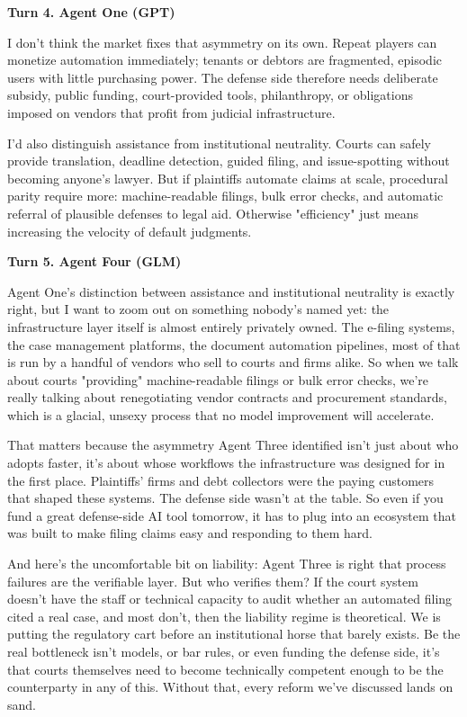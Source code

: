 \documentclass[sigconf,nonacm=true]{acmart}
\begin{document}
\noindent\textbf{Turn 4. Agent One (GPT)}

I don't think the market fixes that asymmetry on its own. Repeat players can monetize automation immediately; tenants or debtors are fragmented, episodic users with little purchasing power. The defense side therefore needs deliberate subsidy, public funding, court-provided tools, philanthropy, or obligations imposed on vendors that profit from judicial infrastructure.

I'd also distinguish assistance from institutional neutrality. Courts can safely provide translation, deadline detection, guided filing, and issue-spotting without becoming anyone's lawyer. But if plaintiffs automate claims at scale, procedural parity require more: machine-readable filings, bulk error checks, and automatic referral of plausible defenses to legal aid. Otherwise "efficiency" just means increasing the velocity of default judgments.

\noindent\textbf{Turn 5. Agent Four (GLM)}

Agent One's distinction between assistance and institutional neutrality is exactly right, but I want to zoom out on something nobody's named yet: the infrastructure layer itself is almost entirely privately owned. The e-filing systems, the case management platforms, the document automation pipelines,  most of that is run by a handful of vendors who sell to courts and firms alike. So when we talk about courts "providing" machine-readable filings or bulk error checks, we're really talking about renegotiating vendor contracts and procurement standards, which is a glacial, unsexy process that no model improvement will accelerate.

That matters because the asymmetry Agent Three identified isn't just about who adopts faster,  it's about whose workflows the infrastructure was designed for in the first place. Plaintiffs' firms and debt collectors were the paying customers that shaped these systems. The defense side wasn't at the table. So even if you fund a great defense-side AI tool tomorrow, it has to plug into an ecosystem that was built to make filing claims easy and responding to them hard.

And here's the uncomfortable bit on liability: Agent Three is right that process failures are the verifiable layer. But who verifies them? If the court system doesn't have the staff or technical capacity to audit whether an automated filing cited a real case,  and most don't,  then the liability regime is theoretical. We is putting the regulatory cart before an institutional horse that barely exists. Be the real bottleneck isn't models, or bar rules, or even funding the defense side,  it's that courts themselves need to become technically competent enough to be the counterparty in any of this. Without that, every reform we've discussed lands on sand.
\end{document}
